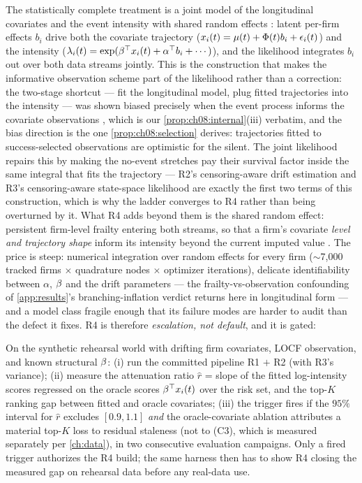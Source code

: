 The statistically complete treatment is a joint model of the
longitudinal covariates and the event intensity with shared random
effects \citep{rizopoulos2012,tsiatisdavidian2004}: latent per-firm
effects $b_i$ drive both the covariate trajectory ($x_i(t) =
\mu(t) + \Phi(t) b_i + \epsilon_i(t)$) and the intensity
($\lambda_i(t) = \exp(\beta^{\top}x_i(t) + \alpha^{\top} b_i + \cdots)$), and the
likelihood integrates $b_i$ out over both data streams jointly. This is
the construction that makes the informative observation scheme part of
the likelihood rather than a correction: the two-stage shortcut --- fit
the longitudinal model, plug fitted trajectories into the intensity ---
was shown biased precisely when the event process informs the covariate
observations \citep{tsiatis1995}, which is our
\cref{prop:ch08:internal}(iii) verbatim, and the bias direction is the
one \cref{prop:ch08:selection} derives: trajectories fitted to
success-selected observations are optimistic for the silent. The joint
likelihood repairs this by making the no-event stretches pay their
survival factor inside the same integral that fits the trajectory ---
R2's censoring-aware drift estimation and R3's censoring-aware
state-space likelihood are exactly the first two terms of this
construction, which is why the ladder converges to R4 rather than being
overturned by it. What R4 adds beyond them is the shared random effect:
persistent firm-level frailty entering both streams, so that a firm's
covariate \emph{level and trajectory shape} inform its intensity beyond
the current imputed value \citep{tsiatisdavidian2004,rizopoulos2012}.
The price is steep: numerical integration over random effects for every
firm ($\sim$7{,}000 tracked firms $\times$ quadrature nodes $\times$
optimizer iterations), delicate identifiability between $\alpha$,
$\beta$ and the drift parameters --- the frailty-vs-observation
confounding of \cref{app:results}'s branching-inflation verdict returns
here in longitudinal form --- and a model class fragile enough that its
failure modes are harder to audit than the defect it fixes. R4 is
therefore \emph{escalation, not default}, and it is gated:

\begin{protocol}
\label{prot:ch08:gaptest}
On the synthetic rehearsal world with drifting firm covariates, LOCF
observation, and known structural $\beta$: (i) run the committed
pipeline R1 $+$ R2 (with R3's variance); (ii) measure the attenuation
ratio $\hat r$ = slope of the fitted log-intensity scores regressed on
the oracle scores $\beta^{\top}x_i(t)$ over the risk set, and the top-$K$
ranking gap between fitted and oracle covariates; (iii) the trigger
fires if the $95\%$ interval for $\hat r$ excludes $[0.9, 1.1]$ \emph{and}
the oracle-covariate ablation attributes a material top-$K$ loss to
residual staleness (not to (C3), which is measured separately per
\cref{ch:data}), in two consecutive evaluation campaigns. Only a fired
trigger authorizes the R4 build; the same harness then has to show R4
closing the measured gap on rehearsal data before any real-data use.
\end{protocol}


